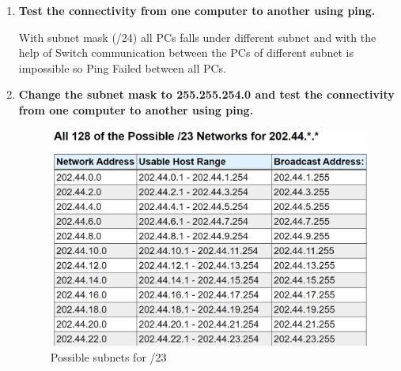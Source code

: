 \documentclass[a4paper,11pt]{article}
\begin{document}
\begin{enumerate}
    \item \textbf{ Test the connectivity from one computer to another using ping.}





          With subnet mask (/24) all PCs falls under different subnet  and with the help of Switch communication between the PCs of different subnet is impossible so Ping Failed between all PCs.



    \item \textbf{ Change the subnet mask to 255.255.254.0 and test the connectivity from one computer to
              another using ping.}



          \begin{figure}[H]
              \centering
              \includegraphics[scale=0.7,cframe=blue 0.5pt 3pt]{./FIG/C23.jpg}
              \caption{Possible subnets for /23 }
          \end{figure}



\end{enumerate}
\end{document}
